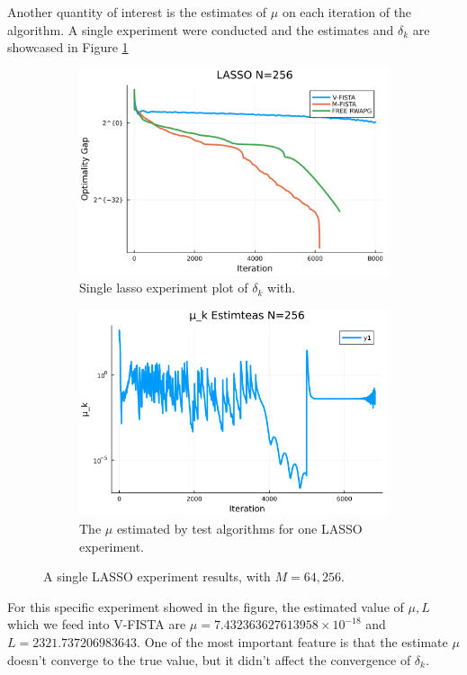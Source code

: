 \documentclass[12pt]{article}
\begin{document}
        \par
        Another quantity of interest is the estimates of $\mu$ on each iteration of the algorithm. 
        A single experiment were conducted and the estimates and $\delta_k$ are showcased in Figure \ref{fig:single-lass-mu-estimates}
        \begin{figure}[H]
            \begin{subfigure}[b]{0.47\textwidth}
                \includegraphics[width=\textwidth]{assets/lasso_loss_256.png}
                \caption{Single lasso experiment plot of $\delta_k$ with.  }
            \end{subfigure}
            \hfill
            \begin{subfigure}[b]{0.47\textwidth}
                \includegraphics[width=\textwidth]{assets/lasso_sc_estimates_256.png}
                \caption{The $\mu$ estimated by test algorithms for one LASSO experiment. }
            \end{subfigure}
            \caption{A single LASSO experiment results, with $M = 64, 256$. }
            \label{fig:single-lass-mu-estimates}
        \end{figure}
        For this specific experiment showed in the figure, the estimated value of $\mu, L$ which we feed into V-FISTA are $\mu = 7.432363627613958\times 10^{-18}$ and $L = 2321.737206983643$. 
        One of the most important feature is that the estimate $\mu$ doesn't converge to the true value, but it didn't affect the convergence of $\delta_k$. 
\end{document}
